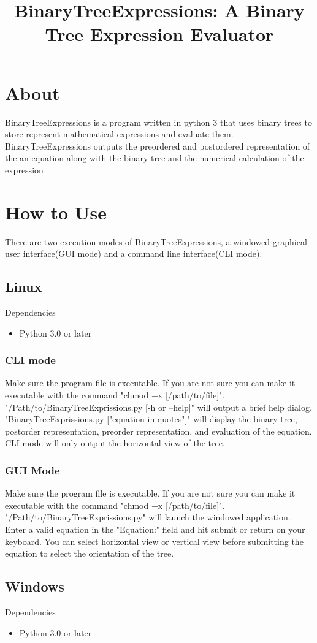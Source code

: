 \documentclass[10pt]{article}
\title{BinaryTreeExpressions: A Binary Tree Expression Evaluator}
\begin{document}
\maketitle
\section{About}
BinaryTreeExpressions is a program written in python 3 that uses binary trees to store represent mathematical expressions and evaluate them. BinaryTreeExpressions outputs the preordered and postordered representation of the an equation along with the binary tree and the numerical calculation of the expression
\section{How to Use}
There are two execution modes of BinaryTreeExpressions, a windowed graphical user interface(GUI mode) and a command line interface(CLI mode).
\subsection{Linux}
Dependencies
\begin{itemize}
\item Python 3.0 or later
\end{itemize}
\subsubsection{CLI mode}
Make sure the program file is executable. If you are not sure you can make it executable with the command "chmod +x [/path/to/file]". "/Path/to/BinaryTreeExprissions.py [-h or --help]"  will output a brief help dialog. "BinaryTreeExprissions.py ["equation in quotes"]" will display the binary tree, postorder representation, preorder representation, and evaluation of the equation. CLI mode will only output the horizontal view of the tree.
\subsubsection{GUI Mode}
Make sure the program file is executable. If you are not sure you can make it executable with the command "chmod +x [/path/to/file]". "/Path/to/BinaryTreeExprissions.py" will launch the windowed application. Enter a valid equation in the "Equation:" field and hit submit or return on your keyboard. You can select horizontal view or vertical view before submitting the equation to select the orientation of the tree. 
\subsection{Windows}
Dependencies
\begin{itemize}
\item Python 3.0 or later
\end{itemize}
\end{document}
